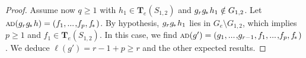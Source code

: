 \documentclass{amsart}
\numberwithin{equation}{section}
\theoremstyle{plain}
\theoremstyle{definition}
\let\ge=\geqslant
\begin{document}
\begin{proof}
Assume now ${q} \ge 1$ with ${h}_1 \in {\boldsymbol{T}}_{e}({S}_{1,2})$ and ${g}_{r} {{g}_{\hspace{-0.2ex}*\hspace{0.2ex}}} {h}_1 \notin {G}_{1,2}$. Let ${{\scriptstyle\mathrm{A\hspace{-0.1ex}D}}({{g}_{r} {{g}_{\hspace{-0.2ex}*\hspace{0.2ex}}} {h}})} = ({f}_1 {, ...\hspace{0.2ex},} {f}_{p}, {{f}_{\hspace{-0.3ex}*\hspace{0.2ex}}})$. By hypothesis, ${g}_{r} {{g}_{\hspace{-0.2ex}*\hspace{0.2ex}}} {h}_1$ lies in ${G}_{e} \setminus {G}_{1,2}$, which implies ${p} \ge 1$ and ${f}_1 \in {\boldsymbol{T}}_{e}({S}_{1,2})$. In this case, we find ${{\scriptstyle\mathrm{A\hspace{-0.1ex}D}}({{g}'})} = ({g}_1 {, ...\hspace{0.2ex},} {g}_{{r}-1}, {f}_1 {, ...\hspace{0.2ex},} {f}_{p}, {{f}_{\hspace{-0.3ex}*\hspace{0.2ex}}})$. We deduce ${\ell({{g}'})} = {r}-1 + {p} \ge {r}$ and the other expected results. 


\end{proof}
\end{document}

